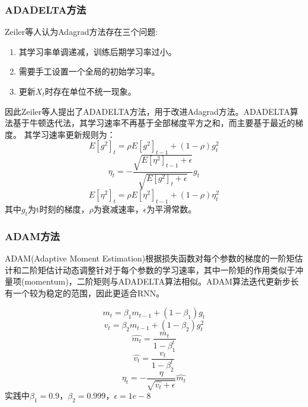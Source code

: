 \subsubsection{ADADELTA方法}
Zeiler等\cite{adadelta}人认为Adagrad方法存在三个问题:
\begin{enumerate}
\item 其学习率单调递减，训练后期学习率过小。
\item 需要手工设置一个全局的初始学习率。
\item 更新$X_t$时存在单位不统一现象。
\end{enumerate}
因此Zeiler等人提出了ADADELTA方法，用于改进Adagrad方法。ADADELTA算法基于牛顿迭代法，其学习速率不再基于全部梯度平方之和，而主要基于最近的梯度。
其学习速率更新规则为：
\begin{equation}
E[g^2]_t = \rho E[g^2]_{t-1} + (1-\rho )g_t^2
\end{equation}
\begin{equation}
\eta_t =  -\frac{\sqrt{E[\eta^2]_{t-1} + \epsilon}}{\sqrt{E[g^2]_{t} + \epsilon}}g_t
\end{equation}
\begin{equation}
E[\eta^2]_t = \rho E[\eta^2]_{t-1} + (1-\rho )\eta_t^2
\end{equation}
其中$g_t$为t时刻的梯度，$\rho$为衰减速率，$\epsilon$为平滑常数。

\subsubsection{ADAM方法}
ADAM(Adaptive Moment Estimation)\cite{adam}根据损失函数对每个参数的梯度的一阶矩估计和二阶矩估计动态调整针对于每个参数的学习速率，其中一阶矩的作用类似于冲量项(momentum)，二阶矩则与ADADELTA算法相似。ADAM算法迭代更新步长有一个较为稳定的范围，因此更适合RNN。

\begin{equation}
m_t = \beta_1 m_{t - 1} + (1 - \beta_1)g_t
\end{equation}
\begin{equation}
v_t = \beta_2 m_{t - 1} + (1 - \beta_2)g_t^2
\end{equation}
\begin{equation}
\hat{m_t} = \frac{m_t}{1 - \beta_1^t}
\end{equation}
\begin{equation}
\hat{v_t} = \frac{v_t}{1 - \beta_2^t}
\end{equation}
\begin{equation}
\eta_t = -\frac{\eta}{\sqrt{\hat{v_t} + \epsilon}} \hat{m_t}
\end{equation}
实践中$\beta_1=0.9$，$\beta_2=0.999$，$\epsilon = 1e-8$

